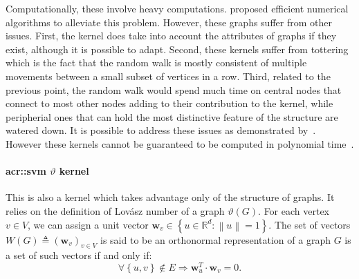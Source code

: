                 Computationally, these involve heavy computations.
                \textcite{vishwanathan2010graph} proposed efficient numerical algorithms to alleviate this problem.
                However, these graphs suffer from other issues.
                First, the kernel does take into account the attributes of graphs if they exist, although it is possible to adapt.
                Second, these kernels suffer from tottering which is the fact that the random walk is mostly consistent of multiple movements between a small subset of vertices in a row.
                Third, related to the previous point, the random walk would spend much time on central nodes that connect to most other nodes adding to their contribution to the kernel, while peripherial ones that can hold the most distinctive feature of the structure are watered down.
                It is possible to address these issues as demonstrated by~\textcite{horvath2004cyclic, mahe2004extensions}.
                However these kernels cannot be guaranteed to be computed in polynomial time~\parencite{vishwanathan2010graph}.

            \paragraph{\gls*{acr::svm} $\vartheta$ kernel}
                This is also a kernel which takes advantage only of the structure of graphs.
                It relies on the definition of Lov\'asz number of a graph $\vartheta(G)$.
                For each vertex $v \in V$, we can assign a unit vector \(\bm{w}_v \in \left\{u \in \mathbb{R}^d: \left\lVert u \right\rVert = 1 \right\}\).
                The set of vectors \(W(G) \triangleq \left(\bm{w}_v\right)_{v \in V}\) is said to be an orthonormal representation of a graph $G$ is a set of such vectors if and only if:
                \begin{equation*}
                    \forall \left\{u,v\right\} \notin E \Rightarrow \bm{w}_u^T\cdot \bm{w}_v=0.
                \end{equation*}

